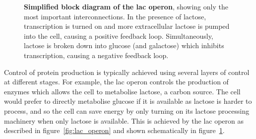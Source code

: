 \begin{figure}
  \centering
  \caption{
    \textbf{Simplified block diagram of the lac operon}, showing only the most
    important interconnections. 
    In the presence of lactose, transcription is turned on and more
    extracellular lactose is pumped into the cell, causing a positive feedback
    loop.
    Simultaneously, lactose is broken down into glucose (and galactose) which
    inhibits transcription, causing a negative feedback loop.
  }
  \label{fig:lac_block}
\end{figure}

Control of protein production is typically achieved using several layers of
control at different stages.
For example, the lac operon controls the production of enzymes which allows the
cell to metabolise lactose, a carbon source.
The cell would prefer to directly metabolise glucose if it is available as
lactose is harder to process, and so the cell can save energy by only turning
on its lactose processing machinery when only lactose is available.
This is achieved by the lac operon as described in figure~\ref{fig:lac_operon} 
and shown schematically in figure~\ref{fig:lac_block}.

